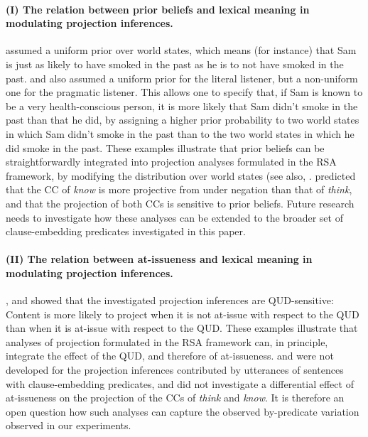 \documentclass[11pt,fleqn]{article}
\newcommand{\6}{\mbox{$[\hspace*{-.6mm}[$}}
\newcommand{\9}{\mbox{$]\hspace*{-.6mm}]$}}
\begin{document}
\paragraph{(I) The relation between prior beliefs and lexical meaning in modulating projection inferences.} \cite{qing-etal2016} assumed a uniform prior over world states, which means (for instance) that Sam is just as likely to have smoked in the past as he is to not have smoked in the past. \cite{warstadt2022} and \citealt{scontras-tonhauser2025} also assumed a uniform prior for the literal listener, but a non-uniform one for the pragmatic listener. This allows one to specify that, if Sam is known to be a very health-conscious person, it is more likely that Sam didn't smoke in the past than that he did, by assigning a higher prior probability to two world states in which Sam didn't smoke in the past than to the two world states in which he did  smoke in the past. These examples illustrate that prior beliefs can be straightforwardly integrated into projection analyses formulated in the RSA framework, by modifying the distribution over world states (see also, \citep[e.g.,][]{goodman-stuhlmueller2013,degen2023-RSA}. \cite{scontras-tonhauser2025} predicted that the CC of \emph{know} is more projective from under negation than that of \emph{think}, and that the projection of both CCs is sensitive to prior beliefs. Future research needs to investigate how these analyses can be extended to the broader set of clause-embedding predicates investigated in this paper. 

\paragraph{(II) The relation between at-issueness and lexical meaning in modulating projection inferences.} \cite{qing-etal2016}, \cite{warstadt2022} and \cite{scontras-tonhauser2025} showed that the investigated projection inferences are QUD-sensitive: Content is more likely to project when it is not at-issue with respect to the QUD than when it is at-issue with respect to the QUD. These examples illustrate that analyses of projection formulated in the RSA framework can, in principle, integrate the effect of the QUD, and therefore of at-issueness. \cite{qing-etal2016} and \cite{warstadt2022} were not developed for the projection inferences contributed by utterances of sentences with clause-embedding predicates, and \cite{scontras-tonhauser2025} did not investigate a differential effect of at-issueness on the projection of the CCs of \emph{think} and \emph{know}. It is therefore an open question how such analyses can capture the observed by-predicate variation observed in our experiments. 
\end{document}
